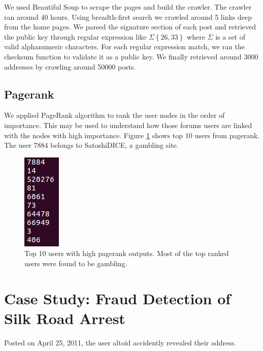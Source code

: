 \documentclass[runningheads,a4paper]{llncs}[2017/09/04]
\begin{document}
We used Beautiful Soup to scrape the pages and build the crawler. The crawler ran around 40 hours. 
Using breadth-first search we crawled around 5 links deep from the home pages. 
We parsed the signature section of each post and retrieved the public key through regular expression like $\Sigma \left\lbrace 26,33\right\rbrace $ where $\Sigma$ is a set of valid alphanumeric characters.
For each regular expression match, we ran the checksum function to validate it as a public key.
We finally retrieved around 3000 addresses by crawling around 50000 posts.

\subsection{Pagerank}

We applied PageRank algorithm to rank the user nodes in the order of importance.
This may be used to understand how those forums users are linked with the nodes with high importance.
Figure \ref{pr} shows top 10 users from pagerank.
The user 7884 belongs to SatoshiDICE, a gambling site.

\begin{figure}[h]
	\centering 
	\includegraphics[width=0.2\columnwidth]{pagerank} 
	\caption{Top 10 users with high pagerank outputs. Most of the top ranked users were found to be gambling.} %
	\label{pr}
\end{figure}

\section{Case Study: Fraud Detection of Silk Road Arrest}

Posted on April 25, 2011, the user altoid accidently revealed their address.
\end{document}
